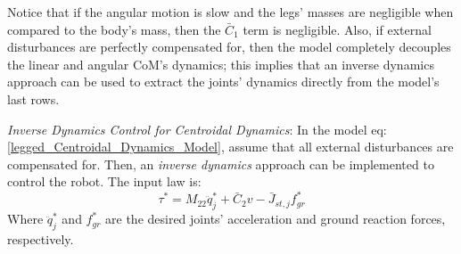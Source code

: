 Notice that if the angular motion is slow and the legs' masses are negligible when compared to the body's mass, then the $\bar{C}_1$ term is negligible. Also, if external disturbances are perfectly compensated for, then the model completely decouples the linear and angular CoM's dynamics; this implies that an inverse dynamics approach can be used to extract the joints' dynamics directly from the model's last rows.
\begin{definition}\label{legged_CoM_inverse_dynamics}
    \textit{Inverse Dynamics Control for Centroidal Dynamics}: In the model eq:\ref{legged_Centroidal_Dynamics_Model}, assume that all external disturbances are compensated for. Then, an \textit{inverse dynamics} approach can be implemented to control the robot. The input law is:
    \begin{equation}\label{legged_CoM_inverse_dynamics_input}
        \tau^*=M_{22}\ddot{q}_j^*+\bar{C}_2v-\bar{J}_{st,j}f^*_{gr}
    \end{equation}
    Where $\ddot{q}_j^*$ and $f_{gr}^*$ are the desired joints' acceleration and ground reaction forces, respectively.
\end{definition}
